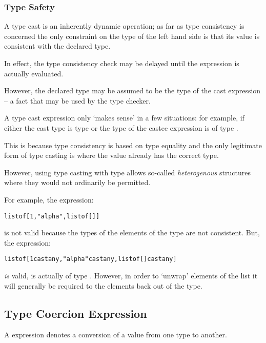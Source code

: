 \subsubsection{Type Safety}
A type cast is an inherently dynamic operation; as far as type consistency is concerned the only constraint on the type of the left hand side is that its value is consistent with the declared type.

In effect, the type consistency check may be delayed until the expression is actually evaluated.

However, the declared type may be assumed to be the type of the cast expression -- a fact that may be used by the type checker.

\begin{prooftree}
\end{prooftree}

\begin{aside}
A type cast expression only `makes sense' in a few situations: for example, if either the cast type is type  or the type of the castee expression is of type .

This is because type consistency is based on type equality and the only legitimate form of type casting is where the value already has the correct type.

However, using type casting with type  allows so-called \emph{heterogenous} structures where they would not ordinarily be permitted.

For example, the  expression:
\begin{alltt}
list of [1, "alpha", list of []]
\end{alltt}
is not valid because the types of the elements of the type are not consistent. But, the expression:
\begin{alltt}
list of [1 cast any, "alpha" cast any, list of [] cast any]
\end{alltt}
\emph{is} valid, is actually of type . However, in order to `unwrap' elements of the list it will generally be required to  the elements back out of the  type.
\end{aside}

\subsection{Type Coercion Expression}
\label{typeCoercionExpression}
\label{typeCoercionContract}
A  expression denotes a conversion of a value from one type to another. 

